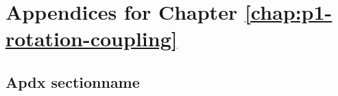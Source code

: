\chapter{Appendices for Chapter \ref{chap:p1-rotation-coupling}}
\label{chap:apdx-p1}
\section{Apdx sectionname}
\label{apdx:p1-sph-symm}
\lipsum[1-3]

